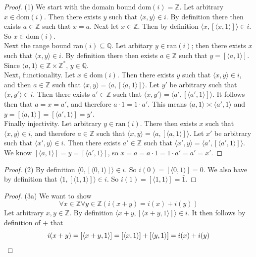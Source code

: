 \documentclass{report}
\begin{document}
\begin{proof}(1)
We start with the domain bound dom$(i)=\mathbb Z$.
Let arbitrary $x\in\text{dom}(i)$. Then there exists $y$ such that $\langle x,y\rangle\in i$. By definition there then exists $a\in\mathbb Z$ such that $x=a$. Next let $x\in\mathbb Z$. Then 
by definition $\langle x,[\langle x,1\rangle]\rangle\in i$. So $x\in\text{dom}(i)$.\\
\indent Next the range bound ran$(i)\subseteq\mathbb Q$. Let arbitary $y\in\text{ran}(i)$; then there exists $x$ such that $\langle x,y\rangle\in i$. By definition there then exists $a\in\mathbb Z$ 
such that $y=[\langle a,1\rangle]$. Since $\langle a,1\rangle\in\mathbb Z\times\mathbb Z^*$, $y\in\mathbb Q$.\\
\indent Next, functionality. Let $x\in\text{dom}(i)$. Then there exists $y$ such that $\langle x,y\rangle\in i$, and then $a\in\mathbb Z$ such that 
$\langle x,y\rangle=\langle a,[\langle a,1\rangle]\rangle$.
Let $y'$ be arbitrary such that $\langle x,y'\rangle\in i$. Then there exists $a'\in\mathbb Z$ such that $\langle x,y'\rangle=\langle a',[\langle a',1\rangle]\rangle$. 
It follows then that $a=x=a'$, and therefore $a\cdot1=1\cdot a'$. This means $\langle a,1\rangle\asymp\langle a',1\rangle$ and $y=[\langle a,1\rangle]=[\langle a',1\rangle]=y'$.\\
\indent Finally injectivity. Let arbitrary $y\in\text{ran}(i)$. There then exists $x$ such that $\langle x,y\rangle\in i$, and therefore $a\in\mathbb Z$ such that 
$\langle x,y\rangle=\langle a,[\langle a,1\rangle]\rangle$. Let $x'$ be arbitrary such that $\langle x',y\rangle\in i$. Then there exists $a'\in\mathbb Z$ such that 
$\langle x',y\rangle=\langle a',[\langle a',1\rangle]\rangle$.
We know $[\langle a,1\rangle]=y=[\langle a',1\rangle]$, so $x=a=a\cdot1=1\cdot a'=a'=x'$.
\end{proof}
\begin{proof}(2)
By definition $\langle 0,[\langle 0,1\rangle]\rangle\in i$. So $i(0)=[\langle 0,1\rangle]=\bar0$.
We also have by definition that $\langle 1,[\langle 1,1\rangle]\rangle\in i$. So $i(1)=[\langle 1,1\rangle]=\bar1$.
\end{proof}
\begin{proof}(3a)
We want to show
\begin{equation*}
\forall x\in\mathbb Z\forall y\in\mathbb Z(i(x+y)=i(x)+i(y))
\end{equation*}
Let arbitrary $x,y\in\mathbb Z$. By definition $\langle x+y,[\langle x+y,1\rangle]\rangle\in i$.
It then follows by definition of $+$ that
\begin{equation*}
i(x+y)=[\langle x+y,1\rangle]=[\langle x,1\rangle]+[\langle y,1\rangle]=i(x)+i(y)\qedhere
\end{equation*}
\end{proof}
\end{document}

